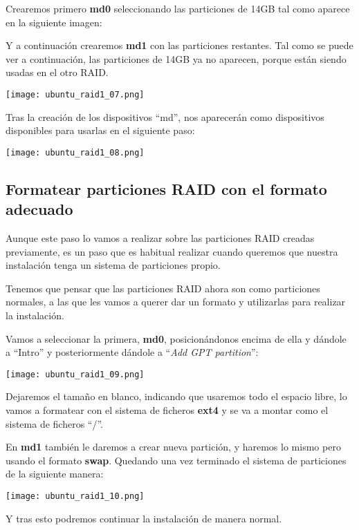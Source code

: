Crearemos primero \textbf{md0} seleccionando las particiones de 14GB tal como aparece en la siguiente imagen:

Y a continuación crearemos \textbf{md1} con las particiones restantes. Tal como se puede ver a continuación, las particiones de 14GB ya no aparecen, porque están siendo usadas en el otro RAID.

\begin{center}
    \vspace{-10pt}
    \texttt{[image: ubuntu\_raid1\_07.png]}
    \vspace{-20pt}
\end{center}


Tras la creación de los dispositivos “md”, nos aparecerán como dispositivos disponibles para usarlas en el siguiente paso:

\begin{center}
    \vspace{-10pt}
    \texttt{[image: ubuntu\_raid1\_08.png]}
    \vspace{-20pt}
\end{center}

\subsection{Formatear particiones RAID con el formato adecuado}
Aunque este paso lo vamos a realizar sobre las particiones RAID creadas previamente, es un paso que es habitual realizar cuando queremos que nuestra instalación tenga un sistema de particiones propio.

Tenemos que pensar que las particiones RAID ahora son como particiones normales, a las que les vamos a querer dar un formato y utilizarlas para realizar la instalación.

Vamos a seleccionar la primera, \textbf{md0}, posicionándonos encima de ella y dándole a “Intro” y posteriormente dándole a “\textit{Add GPT partition}”:

\begin{center}
    \vspace{-10pt}
    \texttt{[image: ubuntu\_raid1\_09.png]}
    \vspace{-20pt}
\end{center}

Dejaremos el tamaño en blanco, indicando que usaremos todo el espacio libre, lo vamos a formatear con el sistema de ficheros \textbf{ext4} y se va a montar como el sistema de ficheros “/”.

En \textbf{md1} también le daremos a crear nueva partición, y haremos lo mismo pero usando el formato \textbf{swap}. Quedando una vez terminado el sistema de particiones de la siguiente manera:

\begin{center}
    \vspace{-10pt}
    \texttt{[image: ubuntu\_raid1\_10.png]}
    \vspace{-20pt}
\end{center}

Y tras esto podremos continuar la instalación de manera normal.
\clearpage